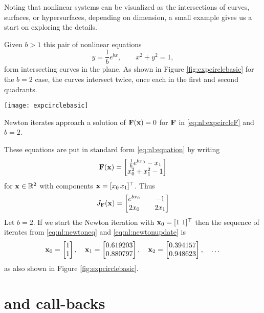 \vfill
\clearpage
Noting that nonlinear systems can be visualized as the intersections of curves, surfaces, or hypersurfaces, depending on dimension, a small example gives us a start on exploring the details.

\medskip\noindent\hrulefill
\begin{example}  Given $b > 1$ this pair of nonlinear equations
    $$y = \frac{1}{b} e^{bx}, \qquad x^2+y^2 = 1,$$
form intersecting curves in the plane.  As shown in Figure \ref{fig:expcirclebasic} for the $b=2$ case, the curves intersect twice, once each in the first and second quadrants.

\begin{marginfigure}
\texttt{[image: expcirclebasic]}
\caption{Newton iterates approach a solution of $\mathbf{F}(\mathbf{x})=0$ for $\mathbf{F}$ in \eqref{eq:nl:expcircleF} and $b=2$.}
\label{fig:expcirclebasic}
\end{marginfigure}

These equations are put in standard form \eqref{eq:nl:equation} by writing
\begin{equation}
\label{eq:nl:expcircleF}
\mathbf{F}(\mathbf{x}) = \begin{bmatrix}
           \frac{1}{b} e^{b x_0} - x_1 \\
           x_0^2 + x_1^2 - 1
           \end{bmatrix}
\end{equation}
for $\mathbf{x}\in \mathbb{R}^2$ with components $\mathbf{x} = [x_0 \, x_1]^\top$.  Thus
\begin{equation}
\label{eq:nl:expcircleJac}
J_{\mathbf{F}}(\mathbf{x}) = \begin{bmatrix}
    e^{b x_0} & & -1 \\
    2 x_0   & & 2 x_1 \end{bmatrix}
\end{equation}
Let $b=2$.  If we start the Newton iteration with $\mathbf{x}_0 = [1 \,\, 1]^\top$ then the sequence of iterates from \eqref{eq:nl:newtoneq} and \eqref{eq:nl:newtonupdate} is
    $${\mathbf{x}}_{0} = \begin{bmatrix} 1 \\ 1 \end{bmatrix}, \quad {\mathbf{x}}_{1} = \begin{bmatrix} 0.619203 \\ 0.880797 \end{bmatrix}, \quad {\mathbf{x}}_{2} = \begin{bmatrix} 0.394157 \\ 0.948623 \end{bmatrix}, \quad \dots$$
as also shown in Figure \ref{fig:expcirclebasic}.

\noindent\hrulefill
\end{example}


\section{\pSNES and call-backs}

